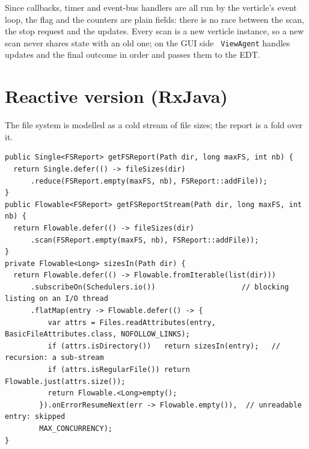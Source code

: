 \documentclass[11pt,a4paper]{article}
\newcommand{\code}[1]{\texttt{\hyphenchar\font=-1 #1}}
\begin{document}
Since callbacks, timer and event-bus handlers are all run by the verticle's event loop, the flag and
the counters are plain fields: there is no race between the scan, the stop request and the updates.
Every scan is a new verticle instance, so a new scan never shares state with an old one; on the GUI
side \code{ViewAgent} handles updates and the final outcome in order and passes them to the EDT.

\section{Reactive version (RxJava)}

The file system is modelled as a cold stream of file sizes; the report is a fold over it.

\begin{lstlisting}
public Single<FSReport> getFSReport(Path dir, long maxFS, int nb) {
  return Single.defer(() -> fileSizes(dir)
      .reduce(FSReport.empty(maxFS, nb), FSReport::addFile));
}
public Flowable<FSReport> getFSReportStream(Path dir, long maxFS, int nb) {
  return Flowable.defer(() -> fileSizes(dir)
      .scan(FSReport.empty(maxFS, nb), FSReport::addFile));
}
private Flowable<Long> sizesIn(Path dir) {
  return Flowable.defer(() -> Flowable.fromIterable(list(dir)))
      .subscribeOn(Schedulers.io())                    // blocking listing on an I/O thread
      .flatMap(entry -> Flowable.defer(() -> {
          var attrs = Files.readAttributes(entry, BasicFileAttributes.class, NOFOLLOW_LINKS);
          if (attrs.isDirectory())   return sizesIn(entry);   // recursion: a sub-stream
          if (attrs.isRegularFile()) return Flowable.just(attrs.size());
          return Flowable.<Long>empty();
        }).onErrorResumeNext(err -> Flowable.empty()),  // unreadable entry: skipped
        MAX_CONCURRENCY);
}
\end{lstlisting}
\end{document}
